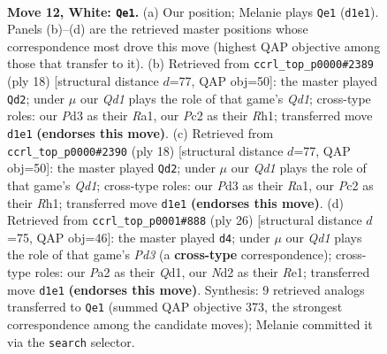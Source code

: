 \documentclass[11pt]{article}
\begin{document}
\clearpage

\begin{figure}[p]\centering
\begin{subfigure}{0.46\textwidth}\centering
\resizebox{\linewidth}{!}{%
\newchessgame
\chessboard[
  setfen={rnbq1rk1/4bp2/4pnp1/ppp4p/3p3P/1P1P1NPB/P1PNPP2/R1BQ1RK1 w - - 0 12},
  showmover=false,
  pgfstyle=straightmove, color=movearrow, markmove={d1-e1}
]}
\caption{}
\end{subfigure}\hfill
\begin{subfigure}{0.46\textwidth}\centering
\resizebox{\linewidth}{!}{%
\newchessgame
\chessboard[
  setfen={rnbqk2r/1p2n1b1/p2p1ppp/2p1p3/4P2P/2NPBNP1/PPP2PB1/R2QK2R w KQkq - 0 10},
  showmover=false,
  pgfstyle=straightmove, color=movearrow, markmove={d1-d2}
]}
\caption{}
\end{subfigure}
\\[4pt]
\begin{subfigure}{0.46\textwidth}\centering
\resizebox{\linewidth}{!}{%
\newchessgame
\chessboard[
  setfen={rnbqk2r/1p2n1b1/p2p1ppp/2p1p3/4P2P/2NPBNP1/PPP2PB1/R2QK2R w KQkq - 0 10},
  showmover=false,
  pgfstyle=straightmove, color=movearrow, markmove={d1-d2}
]}
\caption{}
\end{subfigure}\hfill
\begin{subfigure}{0.46\textwidth}\centering
\resizebox{\linewidth}{!}{%
\newchessgame
\chessboard[
  setfen={2rqr1k1/pb3pb1/1pnppnpp/2p5/2P1P3/1PNPBNPP/P4PB1/2RQR1K1 w - - 3 14},
  showmover=false,
  pgfstyle=straightmove, color=movearrow, markmove={d3-d4}
]}
\caption{}
\end{subfigure}
\caption{\textbf{Move 12, White: \texttt{Qe1}.} (a) Our position; Melanie plays \texttt{Qe1} (\texttt{d1e1}). Panels (b)--(d) are the retrieved master positions whose correspondence most drove this move (highest QAP objective among those that transfer to it). (b) Retrieved from \texttt{ccrl\_top\_p0000\#2389} (ply 18) [structural distance $d$=77, QAP obj=50]: the master played \texttt{Qd2}; under $\mu$ our \emph{Qd1} plays the role of that game's \emph{Qd1}; cross-type roles: our \emph{P}d3 as their \emph{R}a1, our \emph{P}c2 as their \emph{R}h1; transferred move \texttt{d1e1} \textbf{(endorses this move)}. (c) Retrieved from \texttt{ccrl\_top\_p0000\#2390} (ply 18) [structural distance $d$=77, QAP obj=50]: the master played \texttt{Qd2}; under $\mu$ our \emph{Qd1} plays the role of that game's \emph{Qd1}; cross-type roles: our \emph{P}d3 as their \emph{R}a1, our \emph{P}c2 as their \emph{R}h1; transferred move \texttt{d1e1} \textbf{(endorses this move)}. (d) Retrieved from \texttt{ccrl\_top\_p0001\#888} (ply 26) [structural distance $d$=75, QAP obj=46]: the master played \texttt{d4}; under $\mu$ our \emph{Qd1} plays the role of that game's \emph{Pd3} (a \textbf{cross-type} correspondence); cross-type roles: our \emph{P}a2 as their \emph{Q}d1, our \emph{N}d2 as their \emph{R}e1; transferred move \texttt{d1e1} \textbf{(endorses this move)}. Synthesis: 9 retrieved analogs transferred to \texttt{Qe1} (summed QAP objective 373, the strongest correspondence among the candidate moves); Melanie committed it via the \texttt{search} selector.}
\label{fig:thought-m22}
\end{figure}
\end{document}

